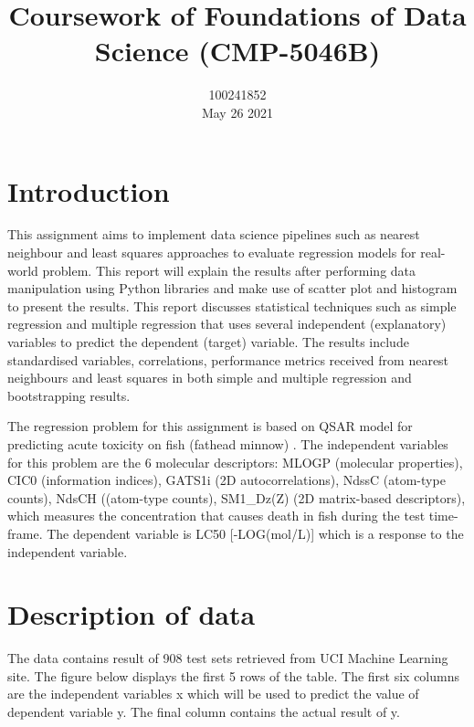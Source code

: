 \documentclass{ueacmpstyle}
\begin{document}
	\title{Coursework of Foundations of Data Science (CMP-5046B)}    %
	\author{
		100241852\\     %
		May 26 2021     %
	}
	\maketitle
	
	\newpage

    \section{Introduction}\label{sec:introduction}
    
    This assignment aims to implement data science pipelines such as nearest neighbour and least squares approaches to evaluate regression models for real-world problem. This report will explain the results after performing data manipulation using Python libraries and make use of scatter plot and histogram to present the results. This report discusses statistical techniques such as simple regression and multiple regression that uses several independent (explanatory) variables to predict the dependent (target) variable. The results include standardised variables, correlations, performance metrics received from nearest neighbours and least squares in both simple and multiple regression and bootstrapping results.
    
    The regression problem for this assignment is based on QSAR model for predicting acute toxicity on fish (fathead minnow) \citep{ref_1}. The independent variables for this problem are the 6 molecular descriptors: MLOGP (molecular properties), CIC0 (information indices), GATS1i (2D autocorrelations), NdssC (atom-type counts), NdsCH ((atom-type counts), SM1\_Dz(Z) (2D matrix-based descriptors), which measures the concentration that causes death in fish during the test time-frame. The dependent variable is LC50 [-LOG(mol/L)] which is a response to the independent variable.
    
    \section{Description of data}\label{sec:description}
    
    The data contains result of 908 test sets retrieved from UCI Machine Learning site. The figure below displays the first 5 rows of the table. The first six columns are the independent variables x which will be used to predict the value of dependent variable y. The final column contains the actual result of y.
    
\end{document}

